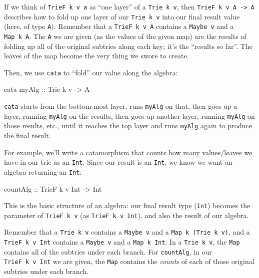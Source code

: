 \documentclass[]{article}
\newenvironment{Shaded}{}{}
\newcommand{\DataTypeTok}[1]{\textcolor[rgb]{0.56,0.13,0.00}{#1}}
\newcommand{\NormalTok}[1]{#1}
\newcommand{\OtherTok}[1]{\textcolor[rgb]{0.00,0.44,0.13}{#1}}
\begin{document}
If we think of \texttt{TrieF\ k\ v\ a} as ``one layer'' of a
\texttt{Trie\ k\ v}, then \texttt{TrieF\ k\ v\ A\ -\textgreater{}\ A} describes
how to fold up one layer of our \texttt{Trie\ k\ v} into our final result value
(here, of type \texttt{A}). Remember that a \texttt{TrieF\ k\ v\ A} contains a
\texttt{Maybe\ v} and a \texttt{Map\ k\ A}. The \texttt{A} we are given (as the
values of the given map) are the results of folding up all of the original
subtries along each key; it's the ``results so far''. The leaves of the map
become the very thing we swore to create.

Then, we use \texttt{cata} to ``fold'' our value along the algebra:

\begin{Shaded}
\begin{Highlighting}[]
\NormalTok{cata}\OtherTok{ myAlg ::} \DataTypeTok{Trie}\NormalTok{ k v }\OtherTok{->} \DataTypeTok{A}
\end{Highlighting}
\end{Shaded}

\texttt{cata} starts from the bottom-most layer, runs \texttt{myAlg} on that,
then goes up a layer, running \texttt{myAlg} on the results, then goes up
another layer, running \texttt{myAlg} on those results, etc., until it reaches
the top layer and runs \texttt{myAlg} again to produce the final result.

For example, we'll write a catamorphism that counts how many values/leaves we
have in our trie as an \texttt{Int}. Since our result is an \texttt{Int}, we
know we want an algebra returning an \texttt{Int}:

\begin{Shaded}
\begin{Highlighting}[]
\OtherTok{countAlg ::} \DataTypeTok{TrieF}\NormalTok{ k v }\DataTypeTok{Int} \OtherTok{->} \DataTypeTok{Int}
\end{Highlighting}
\end{Shaded}

This is the basic structure of an algebra: our final result type (\texttt{Int})
becomes the parameter of \texttt{TrieF\ k\ v} (as \texttt{TrieF\ k\ v\ Int}),
and also the result of our algebra.

Remember that a \texttt{Trie\ k\ v} contains a \texttt{Maybe\ v} and a
\texttt{Map\ k\ (Trie\ k\ v)}, and a \texttt{TrieF\ k\ v\ Int} contains a
\texttt{Maybe\ v} and a \texttt{Map\ k\ Int}. In a \texttt{Trie\ k\ v}, the
\texttt{Map} contains all of the subtries under each branch. For
\texttt{countAlg}, in our \texttt{TrieF\ k\ v\ Int} we are given, the
\texttt{Map} contains the \emph{counts} of each of those original subtries under
each branch.
\end{document}
